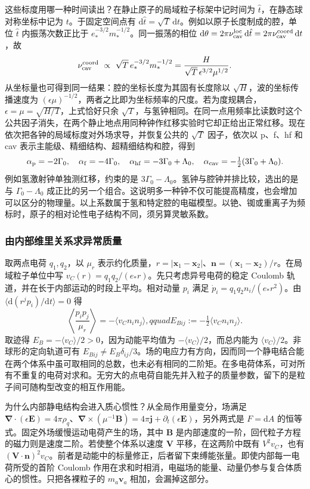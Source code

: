这些标度用哪一种时间读出？在静止原子的局域粒子标架中记时间为 $\hat t$，在静态球对称坐标中记为 $t$。于固定空间点有 $\mathrm d\hat t=\sqrt{T}\,\mathrm dt$。例如以原子长度制成的腔，单位 $\hat t$ 内振荡次数正比于 $e_*^{-3/2}m_*^{-1/2}$。同一振荡的相位 $\mathrm d\theta=2\pi\nu_{\rm cav}^{\rm loc}\,\mathrm d\hat t=2\pi\nu_{\rm cav}^{\rm coord}\,\mathrm dt$，故
\[
 \nu_{\rm cav}^{\rm coord}\ \propto\ \sqrt{T}\,e_*^{-3/2}m_*^{-1/2}
   =\frac{H}{\sqrt T\,\epsilon^{3/2}\mu^{1/2}} .
\]
从坐标量也可得到同一结果：腔的坐标长度为其固有长度除以 $\sqrt H$，波的坐标传播速度为 $(\epsilon\mu)^{-1/2}$，两者之比即为坐标频率的尺度。若为度规耦合，$\epsilon=\mu=\sqrt{H/T}$，上式恰好只余 $\sqrt T$，与氢钟相同。在同一点用频率比读数时这个公共因子消失，在两个静止地点用同种钟作红移实验时它却正给出正常红移。现在依次把各钟的局域标度对外场求导，并恢复公共的 $\sqrt{T}$ 因子，依次以 p、f、hf 和 cav 表示主能级、精细结构、超精细结构和腔，得到
\[
 \alpha_{\rm p}=-2\Gamma_0,\quad
 \alpha_{\rm f}=-4\Gamma_0,\quad
 \alpha_{\rm hf}=-3\Gamma_0+\Lambda_0,\quad
 \alpha_{\rm cav}=-\tfrac12(3\Gamma_0+\Lambda_0).
\]
例如氢激射钟单独测红移，约束的是 $3\Gamma_0-\Lambda_0$。氢钟与腔钟并排比较，选出的是与 $\Gamma_0-\Lambda_0$ 成正比的另一个组合。这说明多一种钟不仅可能提高精度，也会增加可以区分的物理量。以上系数属于氢和特定腔的电磁模型。以铯、铷或重离子为频标时，原子的相对论性电子结构不同，须另算灵敏系数。

\subsubsection{由内部维里关系求异常质量}\label{sec:exp-binding-mass}

取两点电荷 $q_1,q_2$，以 $\mu_r$ 表示约化质量，$r=|\bm x_1-\bm x_2|$、$\bm n=(\bm x_1-\bm x_2)/r$。在局域粒子单位中写 $v_C(r)=q_1q_2/(e_*r)$。先只考虑异号电荷的稳定 Coulomb 轨道，并在长于内部运动的时段上平均。相对动量 $p_i$ 满足 $\dot p_i=q_1q_2 n_i/(e_*r^2)$。由 $\langle\mathrm d(r^jp_i)/\mathrm dt\rangle=0$ 得
\[
    \left\langle\frac{p_ip_j}{\mu_r}\right\rangle
       =-\langle v_C n_i n_j\rangle,qquad
    E_{Bij}:=-\tfrac12\langle v_C n_i n_j\rangle .
\]
取迹得 $E_B=-\langle v_C\rangle/2>0$，因为动能平均值为 $-\langle v_C\rangle/2$，而总内能为 $\langle v_C\rangle/2$。非球形的定向轨道可有 $E_{Bij}\ne E_B\delta_{ij}/3$。场的电应力有方向，因而同一个静电结合能在两个体系中虽可取相同的总数，也未必有相同的二阶矩。在多电荷体系，可对所有不重复的电荷对求和。无穷大的点电荷自能先并入粒子的质量参数，留下的是粒子间可随构型改变的相互作用能。

为什么内部静电结构会进入质心惯性？从全局作用量变分，场满足 $\bm\nabla\cdot(\epsilon\bm E)=4\pi\rho_q$、$\bm\nabla\times(\mu^{-1}\bm B)=4\pi\bm j+\partial_t(\epsilon\bm E)$，另外两式是 $F=\mathrm dA$ 的恒等式。固定外场缓慢运动电荷产生的场，其中 $\bm B$ 是内部速度的一阶，回代粒子方程的磁力则是速度二阶。若使整个体系以速度 $\bm V$ 平移，在这两阶中既有 $V^2 v_C$，也有 $(\bm V\cdot\bm n)^2v_C$。前者是动能中的标量修正，后者留下束缚能张量。即使内部每一电荷所受的首阶 Coulomb 作用在求和时相消，电磁场的能量、动量仍参与复合体质心的惯性。只把各裸粒子的 $m_a\bm v_a$ 相加，会漏掉这部分。

